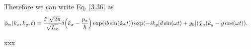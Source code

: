 Therefore we can write Eq. \eqref{3.36} as
\begin{equation} \label{3.40}
  \begin{aligned}
    \phi_{\alpha}(k_x,k_y,t) & =
    \frac{i^n\sqrt{2\pi}}{\sqrt{L_x}}
    \delta\qty(k_x -\frac{p_x}{\hbar})
    \exp(
      ib\sin(2\omega t)
    )
    \exp(
      -ik_y  \qty[d\sin(\omega t) + y_0]
    )
    \tilde{\chi}_{n}\qty(k_y -g\cos(\omega t)).
  \end{aligned}
\end{equation}











xxx
